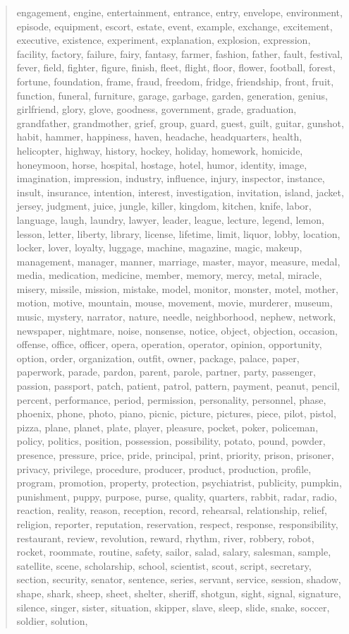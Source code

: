 \documentclass{article}
\begin{document}
\begin{quote}
engagement, engine, entertainment, entrance, entry, envelope, environment, episode, equipment, escort, estate, event, example, exchange, excitement, executive, existence, experiment, explanation, explosion, expression, facility, factory, failure, fairy, fantasy, farmer, fashion, father, fault, festival, fever, field, fighter, figure, finish, fleet, flight, floor, flower, football, forest, fortune, foundation, frame, fraud, freedom, fridge, friendship, front, fruit, function, funeral, furniture, garage, garbage, garden, generation, genius, girlfriend, glory, glove, goodness, government, grade, graduation, grandfather, grandmother, grief, group, guard, guest, guilt, guitar, gunshot, habit, hammer, happiness, haven, headache, headquarters, health, helicopter, highway, history, hockey, holiday, homework, homicide, honeymoon, horse, hospital, hostage, hotel, humor, identity, image, imagination, impression, industry, influence, injury, inspector, instance, insult, insurance, intention, interest, investigation, invitation, island, jacket, jersey, judgment, juice, jungle, killer, kingdom, kitchen, knife, labor, language, laugh, laundry, lawyer, leader, league, lecture, legend, lemon, lesson, letter, liberty, library, license, lifetime, limit, liquor, lobby, location, locker, lover, loyalty, luggage, machine, magazine, magic, makeup, management, manager, manner, marriage, master, mayor, measure, medal, media, medication, medicine, member, memory, mercy, metal, miracle, misery, missile, mission, mistake, model, monitor, monster, motel, mother, motion, motive, mountain, mouse, movement, movie, murderer, museum, music, mystery, narrator, nature, needle, neighborhood, nephew, network, newspaper, nightmare, noise, nonsense, notice, object, objection, occasion, offense, office, officer, opera, operation, operator, opinion, opportunity, option, order, organization, outfit, owner, package, palace, paper, paperwork, parade, pardon, parent, parole, partner, party, passenger, passion, passport, patch, patient, patrol, pattern, payment, peanut, pencil, percent, performance, period, permission, personality, personnel, phase, phoenix, phone, photo, piano, picnic, picture, pictures, piece, pilot, pistol, pizza, plane, planet, plate, player, pleasure, pocket, poker, policeman, policy, politics, position, possession, possibility, potato, pound, powder, presence, pressure, price, pride, principal, print, priority, prison, prisoner, privacy, privilege, procedure, producer, product, production, profile, program, promotion, property, protection, psychiatrist, publicity, pumpkin, punishment, puppy, purpose, purse, quality, quarters, rabbit, radar, radio, reaction, reality, reason, reception, record, rehearsal, relationship, relief, religion, reporter, reputation, reservation, respect, response, responsibility, restaurant, review, revolution, reward, rhythm, river, robbery, robot, rocket, roommate, routine, safety, sailor, salad, salary, salesman, sample, satellite, scene, scholarship, school, scientist, scout, script, secretary, section, security, senator, sentence, series, servant, service, session, shadow, shape, shark, sheep, sheet, shelter, sheriff, shotgun, sight, signal, signature, silence, singer, sister, situation, skipper, slave, sleep, slide, snake, soccer, soldier, solution, 
\end{quote}
\end{document}
